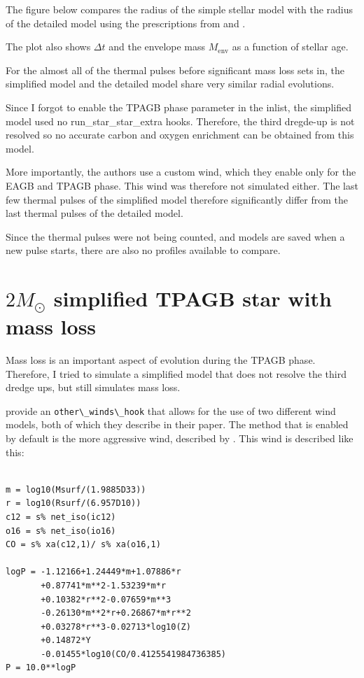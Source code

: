 \documentclass[a4paper,10pt]{article}
\begin{document}
The figure below compares the radius of the simple stellar model with the radius of the detailed model using the prescriptions from \citet{rees2024a} and \citet{rees2024b}.

The plot also shows \(\Delta t\) and the envelope mass \(M _\text{env}\) as a function of stellar age.

\begin{figure}[ht]
    \centering
\end{figure}

For the almost all of the thermal pulses before significant mass loss sets in, the simplified model and the detailed model share very similar radial evolutions.

Since I forgot to enable the TPAGB phase parameter in the inlist, the simplified model used no run\_star\_star\_extra hooks. 
Therefore, the third dregde-up is not resolved so no accurate carbon and oxygen enrichment can be obtained from this model.

More importantly, the authors use a custom wind, which they enable only for the EAGB and TPAGB phase. This wind was therefore not simulated either.
The last few thermal pulses of the simplified model therefore significantly differ from the last thermal pulses of the detailed model.

Since the thermal pulses were not being counted, and models are saved when a new pulse starts, there are also no profiles available to compare.

\newpage
\section{\texorpdfstring{$2 M_\odot $}{2 solar mass} simplified TPAGB star with mass loss}

Mass loss is an important aspect of evolution during the TPAGB phase. Therefore, I tried to simulate a simplified model that does not resolve the third dredge ups, but still simulates mass loss.

\citet{rees2024b} provide an \lstinline[style=output, breaklines=true]|other\_winds\_hook| that allows for the use of two different wind models, both of which they describe in their paper.
The method that is enabled by default is the more aggressive wind, described by \citet{trabucchi2018}. This wind is described like this:
\begin{lstlisting}[style=output, firstnumber=1]

m = log10(Msurf/(1.9885D33))
r = log10(Rsurf/(6.957D10))
c12 = s% net_iso(ic12)
o16 = s% net_iso(io16)
CO = s% xa(c12,1)/ s% xa(o16,1)

logP = -1.12166+1.24449*m+1.07886*r
       +0.87741*m**2-1.53239*m*r
       +0.10382*r**2-0.07659*m**3
       -0.26130*m**2*r+0.26867*m*r**2
       +0.03278*r**3-0.02713*log10(Z)
       +0.14872*Y
       -0.01455*log10(CO/0.4125541984736385)
P = 10.0**logP
\end{lstlisting}
\end{document}

